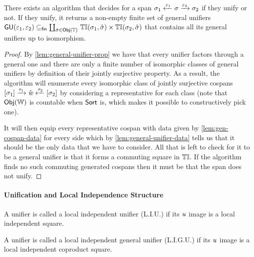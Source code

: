 \begin{lemma}\label{lem:unification-dec}
    There exists an algorithm that decides for a span $\sigma_1 \xleftarrow{\varepsilon_1} \sigma \xrightarrow{\varepsilon_2} \sigma_2$ if they unify or not.
    If they unify, it returns a non-empty finite set of general unifiers
    $\mathsf{GU}(\varepsilon_1, \varepsilon_2) \subseteq_{\mathsf{fin}} \coprod_{\hat\sigma \in \mathsf{Obj}({\mathbb{T}})}\,{{{\mathbb{T}\mathbb{I}}}({\sigma_1}, {\hat\sigma}) \times {{\mathbb{T}\mathbb{I}}}({\sigma_2}, {\hat\sigma})}$
    that contains all its general unifiers up to isomorphism.
\end{lemma}
\begin{proof}
    By \cref{lem:general-unifier-prop} we have that every unifier factors through a general one and there are only a finite number of isomorphic classes of general unifiers by definition of their jointly surjective property.
    As a result, the algorithm will enumerate every isomorphic class of jointly surjective cospans $[\sigma_1] \xrightarrow{\tau_1} \hat{\mathit{w}} \xleftarrow{\tau_2} [\sigma_2]$
    by considering a representative for each class (note that $\mathsf{Obj}({\mathbb{W}})$ is countable when $\mathsf{Sort}$ is, which makes it possible to constructively pick one). 

    It will then equip every representative cospan with data given by \cref{lem:gen-cospan-data} for every side which by \cref{lem:general-unifier-data} tells us that it should be the only data that we have to consider. 
    All that is left to check for it to be a general unifier is that it forms a commuting square in ${\mathbb{T}\mathbb{I}}$.
    If the algorithm finds no such commuting generated cospans then it must be that the span does not unify.
\end{proof}

\paragraph{Unification and Local Independence Structure}\nl

\begin{definition}
    A unifier is called a local independent unifier (L.I.U.) if its $\mathit{u}$ image is a local independent square.
\end{definition}

\begin{definition}
    A unifier is called a local independent general unifier (L.I.G.U.) if its $\mathit{u}$ image is a local independent coproduct square.
\end{definition}


